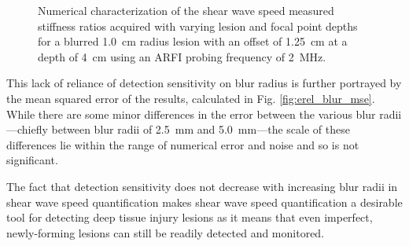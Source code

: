 			\begin{figure}[!htb]
				\centering
				\caption[Numerical characterization of shear wave speed measured stiffness ratio with blurred lesions]{Numerical characterization of the shear wave speed measured stiffness ratios acquired with varying lesion and focal point depths for a blurred \SI{1.0}{cm} radius lesion with an offset of \SI{1.25}{\cm} at a depth of \SI{4}{\cm} using an ARFI probing frequency of \SI{2}{\MHz}.}
				\label{fig:erel_blur}
			\end{figure}

			This lack of reliance of detection sensitivity on blur radius is further portrayed by the mean squared error of the results, calculated in Fig. \ref{fig:erel_blur_mse}. While there are some minor differences in the error between the various blur radii---chiefly between blur radii of \SI{2.5}{\mm} and \SI{5.0}{\mm}---the scale of these differences lie within the range of numerical error and noise and so is not significant.

			The fact that detection sensitivity does not decrease with increasing blur radii in shear wave speed quantification makes shear wave speed quantification a desirable tool for detecting deep tissue injury lesions as it means that even imperfect, newly-forming lesions can still be readily detected and monitored.

